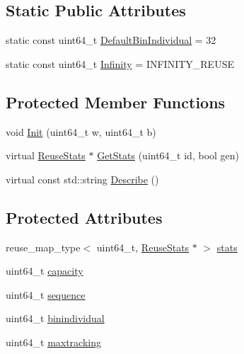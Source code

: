 \subsection*{Static Public Attributes}
\begin{DoxyCompactItemize}
\item 
static const uint64\_\-t \hyperlink{class_reuse_distance_af0d9cba7105109e89ae6b7177f54c976}{DefaultBinIndividual} = 32
\item 
static const uint64\_\-t \hyperlink{class_reuse_distance_a59f7f0ac6ad014472537619394ac7375}{Infinity} = INFINITY\_\-REUSE
\end{DoxyCompactItemize}
\subsection*{Protected Member Functions}
\begin{DoxyCompactItemize}
\item 
void \hyperlink{class_reuse_distance_a265c98b7a9460b3312ea5c78dae968cc}{Init} (uint64\_\-t w, uint64\_\-t b)
\item 
virtual \hyperlink{class_reuse_stats}{ReuseStats} $\ast$ \hyperlink{class_reuse_distance_adb13097f908e002f1da8e188d7dc3210}{GetStats} (uint64\_\-t id, bool gen)
\item 
virtual const std::string \hyperlink{class_reuse_distance_a6ef63a5e5b15c5dce387e026d40d6ef2}{Describe} ()
\end{DoxyCompactItemize}
\subsection*{Protected Attributes}
\begin{DoxyCompactItemize}
\item 
reuse\_\-map\_\-type$<$ uint64\_\-t, \hyperlink{class_reuse_stats}{ReuseStats} $\ast$ $>$ \hyperlink{class_reuse_distance_a37e4f6796798fe8839e94c956b4354ee}{stats}
\item 
uint64\_\-t \hyperlink{class_reuse_distance_a8e3536264e92460f10455af7f1e161fd}{capacity}
\item 
uint64\_\-t \hyperlink{class_reuse_distance_a5d38c22d7841765630b828eed50ac345}{sequence}
\item 
uint64\_\-t \hyperlink{class_reuse_distance_a62dae87cc1183b8bcbfa2220ddd9a3e2}{binindividual}
\item 
uint64\_\-t \hyperlink{class_reuse_distance_ac3e8daa6fa8c16cdf955fd6cf99ba932}{maxtracking}
\end{DoxyCompactItemize}


